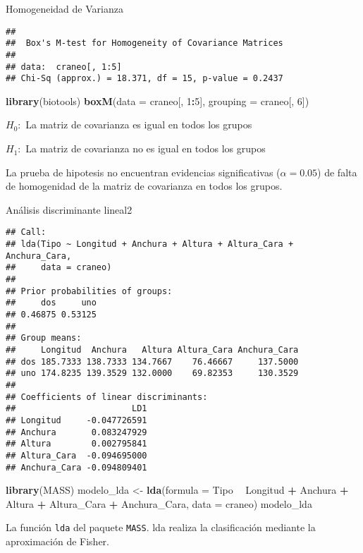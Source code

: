 \documentclass[ignorenonframetext,]{beamer}
\newenvironment{Shaded}{\begin{snugshade}}{\end{snugshade}}
\newcommand{\KeywordTok}[1]{\textcolor[rgb]{0.13,0.29,0.53}{\textbf{#1}}}
\newcommand{\DataTypeTok}[1]{\textcolor[rgb]{0.13,0.29,0.53}{#1}}
\newcommand{\DecValTok}[1]{\textcolor[rgb]{0.00,0.00,0.81}{#1}}
\newcommand{\StringTok}[1]{\textcolor[rgb]{0.31,0.60,0.02}{#1}}
\newcommand{\OperatorTok}[1]{\textcolor[rgb]{0.81,0.36,0.00}{\textbf{#1}}}
\newcommand{\NormalTok}[1]{#1}
\begin{document}
\begin{frame}[fragile]{Homogeneidad de Varianza}

\hypertarget{left}{}
\begin{verbatim}
## 
##  Box's M-test for Homogeneity of Covariance Matrices
## 
## data:  craneo[, 1:5]
## Chi-Sq (approx.) = 18.371, df = 15, p-value = 0.2437
\end{verbatim}

\hypertarget{right}{}
\begin{Shaded}
\begin{Highlighting}[]
\KeywordTok{library}\NormalTok{(biotools)}
\KeywordTok{boxM}\NormalTok{(}\DataTypeTok{data =}\NormalTok{ craneo[, }\DecValTok{1}\OperatorTok{:}\DecValTok{5}\NormalTok{], }\DataTypeTok{grouping =}\NormalTok{ craneo[, }\DecValTok{6}\NormalTok{])}
\end{Highlighting}
\end{Shaded}

\(H_0:\) La matriz de covarianza es igual en todos los grupos

\(H_1:\) La matriz de covarianza no es igual en todos los grupos

La prueba de hipotesis no encuentran evidencias significativas
(\(\alpha=0.05\)) de falta de homogenidad de la matriz de covarianza en
todos los grupos.

\end{frame}

\begin{frame}[fragile]{Análisis discriminante lineal2}

\hypertarget{left}{}
\begin{verbatim}
## Call:
## lda(Tipo ~ Longitud + Anchura + Altura + Altura_Cara + Anchura_Cara, 
##     data = craneo)
## 
## Prior probabilities of groups:
##     dos     uno 
## 0.46875 0.53125 
## 
## Group means:
##     Longitud  Anchura   Altura Altura_Cara Anchura_Cara
## dos 185.7333 138.7333 134.7667    76.46667     137.5000
## uno 174.8235 139.3529 132.0000    69.82353     130.3529
## 
## Coefficients of linear discriminants:
##                       LD1
## Longitud     -0.047726591
## Anchura       0.083247929
## Altura        0.002795841
## Altura_Cara  -0.094695000
## Anchura_Cara -0.094809401
\end{verbatim}

\hypertarget{right}{}
\begin{Shaded}
\begin{Highlighting}[]
\KeywordTok{library}\NormalTok{(MASS)}
\NormalTok{modelo_lda <-}\StringTok{ }\KeywordTok{lda}\NormalTok{(}\DataTypeTok{formula =}\NormalTok{ Tipo }\OperatorTok{~}\StringTok{ }\NormalTok{Longitud }\OperatorTok{+}\StringTok{ }\NormalTok{Anchura }\OperatorTok{+}\StringTok{ }\NormalTok{Altura }\OperatorTok{+}\StringTok{ }\NormalTok{Altura_Cara }\OperatorTok{+}\StringTok{ }\NormalTok{Anchura_Cara, }\DataTypeTok{data =}\NormalTok{ craneo)}
\NormalTok{modelo_lda}
\end{Highlighting}
\end{Shaded}

La función \texttt{lda} del paquete \texttt{MASS}. lda realiza la
clasificación mediante la aproximación de Fisher.

\end{frame}
\end{document}
